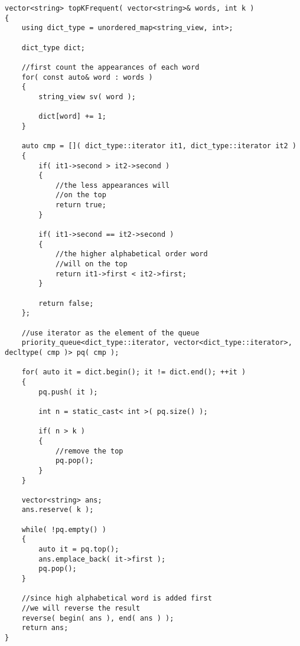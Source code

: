 \setcounter{lstlisting}{0}
\begin{lstlisting}[style=customc, caption={Heap}]
vector<string> topKFrequent( vector<string>& words, int k )
{
    using dict_type = unordered_map<string_view, int>;

    dict_type dict;

    //first count the appearances of each word
    for( const auto& word : words )
    {
        string_view sv( word );

        dict[word] += 1;
    }

    auto cmp = []( dict_type::iterator it1, dict_type::iterator it2 )
    {
        if( it1->second > it2->second )
        {
            //the less appearances will
            //on the top
            return true;
        }

        if( it1->second == it2->second )
        {
            //the higher alphabetical order word
            //will on the top
            return it1->first < it2->first;
        }

        return false;
    };

    //use iterator as the element of the queue
    priority_queue<dict_type::iterator, vector<dict_type::iterator>, decltype( cmp )> pq( cmp );

    for( auto it = dict.begin(); it != dict.end(); ++it )
    {
        pq.push( it );

        int n = static_cast< int >( pq.size() );

        if( n > k )
        {
            //remove the top
            pq.pop();
        }
    }

    vector<string> ans;
    ans.reserve( k );

    while( !pq.empty() )
    {
        auto it = pq.top();
        ans.emplace_back( it->first );
        pq.pop();
    }

    //since high alphabetical word is added first
    //we will reverse the result
    reverse( begin( ans ), end( ans ) );
    return ans;
}
\end{lstlisting}